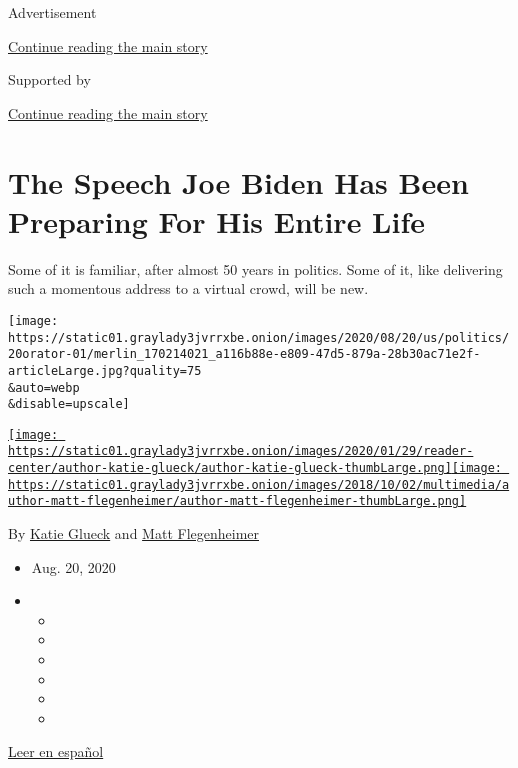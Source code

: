 Advertisement

\protect\hyperlink{after-top}{Continue reading the main story}

Supported by

\protect\hyperlink{after-sponsor}{Continue reading the main story}

\hypertarget{the-speech-joe-biden-has-been-preparing-for-his-entire-life}{%
\section{The Speech Joe Biden Has Been Preparing For His Entire
Life}\label{the-speech-joe-biden-has-been-preparing-for-his-entire-life}}

Some of it is familiar, after almost 50 years in politics. Some of it,
like delivering such a momentous address to a virtual crowd, will be
new.

\texttt{[image: https://static01.graylady3jvrrxbe.onion/images/2020/08/20/us/politics/20orator-01/merlin\_170214021\_a116b88e-e809-47d5-879a-28b30ac71e2f-articleLarge.jpg?quality=75\\\&auto=webp\\\&disable=upscale]}

\href{https://www.nytimes3xbfgragh.onion/by/katie-glueck}{\texttt{[image: https://static01.graylady3jvrrxbe.onion/images/2020/01/29/reader-center/author-katie-glueck/author-katie-glueck-thumbLarge.png]}}\href{https://www.nytimes3xbfgragh.onion/by/matt-flegenheimer}{\texttt{[image: https://static01.graylady3jvrrxbe.onion/images/2018/10/02/multimedia/author-matt-flegenheimer/author-matt-flegenheimer-thumbLarge.png]}}

By \href{https://www.nytimes3xbfgragh.onion/by/katie-glueck}{Katie
Glueck} and
\href{https://www.nytimes3xbfgragh.onion/by/matt-flegenheimer}{Matt
Flegenheimer}

\begin{itemize}
\item
  Aug. 20, 2020
\item
  \begin{itemize}
  \item
  \item
  \item
  \item
  \item
  \item
  \end{itemize}
\end{itemize}

\href{https://www.nytimes3xbfgragh.onion/es/2020/08/20/espanol/estados-unidos/joe-biden-discurso.html}{Leer
en español}


